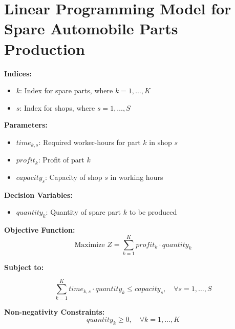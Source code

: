 \documentclass{article}
\begin{document}
\section*{Linear Programming Model for Spare Automobile Parts Production}

\textbf{Indices:}
\begin{itemize}
    \item \(k\): Index for spare parts, where \(k = 1, \ldots, K\)
    \item \(s\): Index for shops, where \(s = 1, \ldots, S\)
\end{itemize}

\textbf{Parameters:}
\begin{itemize}
    \item \(time_{k, s}\): Required worker-hours for part \(k\) in shop \(s\)
    \item \(profit_{k}\): Profit of part \(k\)
    \item \(capacity_{s}\): Capacity of shop \(s\) in working hours
\end{itemize}

\textbf{Decision Variables:}
\begin{itemize}
    \item \(quantity_{k}\): Quantity of spare part \(k\) to be produced
\end{itemize}

\textbf{Objective Function:}
\[
\text{Maximize } Z = \sum_{k=1}^{K} profit_{k} \cdot quantity_{k}
\]

\textbf{Subject to:}

\begin{equation}
\sum_{k=1}^{K} time_{k, s} \cdot quantity_{k} \leq capacity_{s}, \quad \forall s = 1, \ldots, S
\end{equation}

\textbf{Non-negativity Constraints:}
\[
quantity_{k} \geq 0, \quad \forall k = 1, \ldots, K
\]
\end{document}
